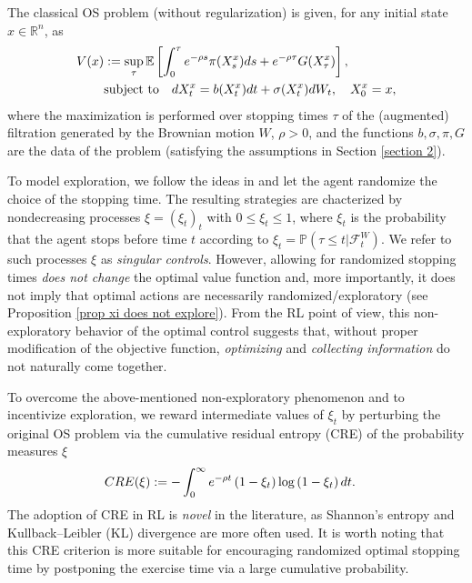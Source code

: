 \documentclass[11pt]{amsart}
\theoremstyle{plain}
\def \dd{{\rm d}}
\def \R{\mathbb{R}}
\def \cF{{\mathcal F}}
\numberwithin{equation}{section}
\begin{document}
The classical OS problem (without regularization) is given, for any initial state $x \in \R^n$, as
\begin{equation*} 
\begin{aligned}
    V(x) &:=  \sup _{\tau} \mathbb{E}\left[\int_{0}^{\tau} e^{- \rho s} \pi (X^x_{s}) \dd s +e ^{- \rho \tau} G(X^x_{\tau})\right], \\
   &\text{subject to} \quad \dd X^x_{t}  =b(X^x_{t}) \dd t+\sigma(X^x_{t}) d W_{t}, \quad X^x_{0}=x, 
\end{aligned}
\end{equation*} 
where the maximization is performed over stopping times $\tau$ of the (augmented) filtration generated by the Brownian motion $W$, $\rho>0$, and the functions $b, \sigma,  \pi, G $ are the data of the problem (satisfying the assumptions in Section \ref{section 2}).

To model exploration, we follow the ideas in \cite{touzi.vieille.2002continuous} and let the agent randomize the choice of the stopping time.
The resulting strategies are chacterized by nondecreasing processes $\xi=(\xi_t)_t$ with $0 \leq \xi_t \leq 1$,
where $\xi_{t}$ is the probability that the agent stops before time $t$ according to 
$\xi_{t}=\mathbb{P}( \tau \leq t | \cF _{t}^{W} )$.
We refer to such processes $\xi$ as \emph{singular controls}. 
However, allowing for randomized stopping times {\it does not change} the optimal value function and, more importantly, it does not imply that optimal actions are necessarily randomized/exploratory (see Proposition \ref{prop xi does not explore}). 
From the RL point of view, this non-exploratory behavior of the optimal control suggests that, without proper modification of the objective function, {\it optimizing} and {\it collecting information} do not naturally come together. 

To overcome the above-mentioned non-exploratory phenomenon and to incentivize exploration, we reward intermediate values of $\xi_t$  by perturbing the original OS problem via the
cumulative residual entropy (CRE) \cite{rao.chen.vemuri.wang.2004cumulative} of the probability measures $\xi$
\begin{eqnarray*}
\begin{aligned}
    {\rm CRE} (\xi) &:= - \int_{0}^{\infty} e^{- \rho t}\left(1-{\xi_{t}}\right) \log \left(1-{\xi_{t}}\right) \dd t.
\end{aligned}
\end{eqnarray*} 
The adoption of CRE in RL is {\it novel} in the literature, as  Shannon's entropy and Kullback–Leibler (KL) divergence are more often used. It is worth noting that this CRE criterion is more suitable for encouraging randomized optimal stopping time by postponing the exercise time via a large cumulative probability. 
\end{document}
